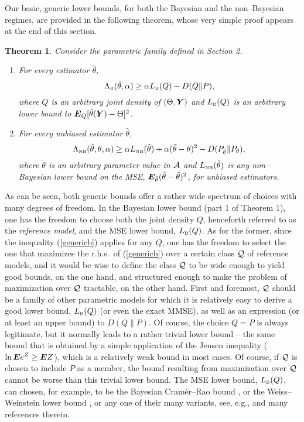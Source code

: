 \documentclass[11pt,epsf]{article}
\newtheorem{theorem}{Theorem}
\newcommand{\ttt}{\tilde{\theta}}
\newcommand{\ct}{\hat{\theta}}
\newcommand {\bE} {\mbox{\boldmath $E$}}
\newcommand {\bY} {\mbox{\boldmath $Y$}}
\newcommand{\calA}{{\cal A}}
\newcommand{\calQ}{{\cal Q}}
\begin{document}
Our basic, generic lower bounds, for both the Bayesian and the 
non--Bayesian regimes, are provided in the following theorem, whose very
simple proof appears at the end of this section.

\begin{theorem}
Consider the parametric family defined in Section 2.
\begin{enumerate}
\item For every estimator $\ct$,
\begin{equation}
\label{genericb}
\Lambda_{\mbox{\tiny B}}(\ct,\alpha)\ge \alpha L_{\mbox{\tiny B}}(Q)-D(Q\|P),
\end{equation}
where $Q$ is an arbitrary joint density of $(\Theta,\bY)$ and
$L_{\mbox{\tiny B}}(Q)$ is an arbitrary lower bound to $\bE_Q[\ct(\bY)-\Theta]^2$.
\item For every unbiased estimator $\ct$,
\begin{equation}
\label{genericnb}
\Lambda_{\mbox{\tiny NB}}(\ct,\theta,\alpha)\ge
\alpha L_{\mbox{\tiny
NB}}(\ttt)+\alpha(\ttt-\theta)^2-D(P_{\ttt}\|P_\theta),
\end{equation}
where $\ttt$ is an arbitrary parameter value in $\calA$ and
$L_{\mbox{\tiny NB}}(\ttt)$ is any non--Bayesian lower bound on the MSE,
$\bE_{\ttt}(\ct-\ttt)^2$, 
for unbiased estimators.
\end{enumerate}
\end{theorem}

As can be seen, both generic bounds offer a rather wide spectrum of
choices with many degrees of freedom. In
the Bayesian lower bound (part 1 of Theorem 1), 
one has the freedom to choose both the joint density $Q$, henceforth
referred to as the {\it reference model}, and the
MSE lower bound,
$L_{\mbox{\tiny B}}(Q)$. As for the former, since the inequality
(\ref{genericb}) applies for any
$Q$, one has the freedom to select the one that maximizes the r.h.s.\ of
(\ref{genericb}) over
a certain class $\calQ$ of reference models, and it would be wise to define the
class $\calQ$ to be wide enough to yield good bounds, on the one hand, and
structured enough to make the problem of maximization over $\calQ$ tractable, on
the other hand. First and foremost, $\calQ$ should be a family of other parametric
models for which it is relatively easy to derive a good lower bound,
$L_{\mbox{\tiny B}}(Q)$ (or even the exact MMSE), as well as an expression (or at least an upper
bound) to $D(Q\|P)$.
Of course, the choice $Q=P$ is always legitimate, but it normally leads to a rather
trivial lower bound -- the same bound that is obtained by a simple application of
the Jensen inequality ($\ln \bE e^Z\ge \bE Z$), which is a relatively weak
bound in most cases. Of course, if $\calQ$ is chosen to include $P$ as a
member, the bound resulting from
maximization over $\calQ$ cannot be worse than this trivial lower bound.
The MSE lower bound, $L_{\mbox{\tiny B}}(Q)$, can chosen, 
for example, to be the Bayesian Cram\'er--Rao bound
\cite{vantrees}, or the Weiss--Weinstein lower bound \cite{weissphd},
or any one of their many variants, see, e.g., \cite{vantreesbell} and
many references therein. 
\end{document}
